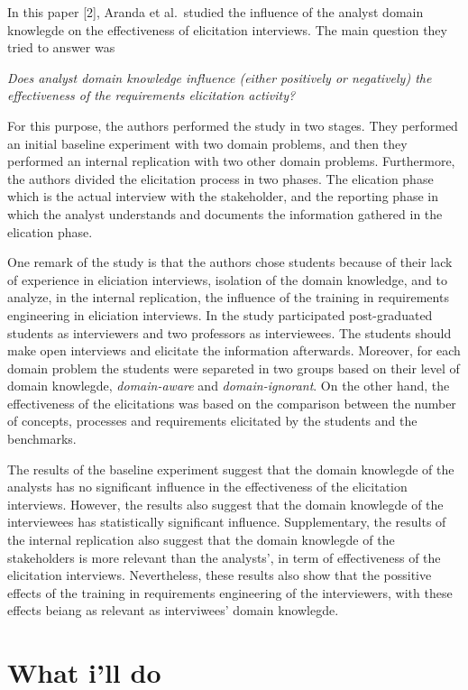 \documentclass[]{llncs}
\begin{document}
In this paper {[}2{]}, Aranda et al.~studied the influence of the
analyst domain knowlegde on the effectiveness of elicitation interviews.
The main question they tried to answer was

\emph{Does analyst domain knowledge influence (either positively or
negatively) the effectiveness of the requirements elicitation activity?}

For this purpose, the authors performed the study in two stages. They
performed an initial baseline experiment with two domain problems, and
then they performed an internal replication with two other domain
problems. Furthermore, the authors divided the elicitation process in
two phases. The elication phase which is the actual interview with the
stakeholder, and the reporting phase in which the analyst understands
and documents the information gathered in the elication phase.

One remark of the study is that the authors chose students because of
their lack of experience in eliciation interviews, isolation of the
domain knowledge, and to analyze, in the internal replication, the
influence of the training in requirements engineering in eliciation
interviews. In the study participated post-graduated students as
interviewers and two professors as interviewees. The students should
make open interviews and elicitate the information afterwards. Moreover,
for each domain problem the students were separeted in two groups based
on their level of domain knowlegde, \emph{domain-aware} and
\emph{domain-ignorant}. On the other hand, the effectiveness of the
elicitations was based on the comparison between the number of concepts,
processes and requirements elicitated by the students and the
benchmarks.

The results of the baseline experiment suggest that the domain knowlegde
of the analysts has no significant influence in the effectiveness of the
elicitation interviews. However, the results also suggest that the
domain knowlegde of the interviewees has statistically significant
influence. Supplementary, the results of the internal replication also
suggest that the domain knowlegde of the stakeholders is more relevant
than the analysts', in term of effectiveness of the elicitation
interviews. Nevertheless, these results also show that the possitive
effects of the training in requirements engineering of the interviewers,
with these effects beiang as relevant as interviwees' domain knowlegde.

\hypertarget{what-ill-do}{%
\section{What i'll do}\label{what-ill-do}}
\end{document}
